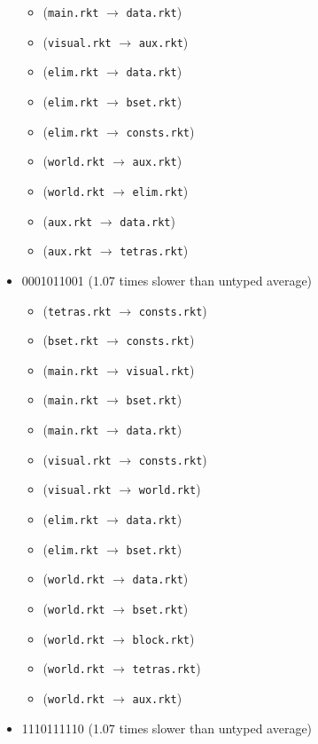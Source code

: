 \documentclass{article}
\newcommand{\mono}[1]{\texttt{#1}}
\begin{document}
\begin{itemize}
\begin{itemize}
  \item (\mono{main.rkt} $\rightarrow$ \mono{data.rkt})
  \item (\mono{visual.rkt} $\rightarrow$ \mono{aux.rkt})
  \item (\mono{elim.rkt} $\rightarrow$ \mono{data.rkt})
  \item (\mono{elim.rkt} $\rightarrow$ \mono{bset.rkt})
  \item (\mono{elim.rkt} $\rightarrow$ \mono{consts.rkt})
  \item (\mono{world.rkt} $\rightarrow$ \mono{aux.rkt})
  \item (\mono{world.rkt} $\rightarrow$ \mono{elim.rkt})
  \item (\mono{aux.rkt} $\rightarrow$ \mono{data.rkt})
  \item (\mono{aux.rkt} $\rightarrow$ \mono{tetras.rkt})
  \end{itemize}
\item 0001011001 (1.07 times slower than untyped average)
  \begin{itemize}
  \item (\mono{tetras.rkt} $\rightarrow$ \mono{consts.rkt})
  \item (\mono{bset.rkt} $\rightarrow$ \mono{consts.rkt})
  \item (\mono{main.rkt} $\rightarrow$ \mono{visual.rkt})
  \item (\mono{main.rkt} $\rightarrow$ \mono{bset.rkt})
  \item (\mono{main.rkt} $\rightarrow$ \mono{data.rkt})
  \item (\mono{visual.rkt} $\rightarrow$ \mono{consts.rkt})
  \item (\mono{visual.rkt} $\rightarrow$ \mono{world.rkt})
  \item (\mono{elim.rkt} $\rightarrow$ \mono{data.rkt})
  \item (\mono{elim.rkt} $\rightarrow$ \mono{bset.rkt})
  \item (\mono{world.rkt} $\rightarrow$ \mono{data.rkt})
  \item (\mono{world.rkt} $\rightarrow$ \mono{bset.rkt})
  \item (\mono{world.rkt} $\rightarrow$ \mono{block.rkt})
  \item (\mono{world.rkt} $\rightarrow$ \mono{tetras.rkt})
  \item (\mono{world.rkt} $\rightarrow$ \mono{aux.rkt})
  \end{itemize}
\item 1110111110 (1.07 times slower than untyped average)

\end{itemize}
\end{document}
